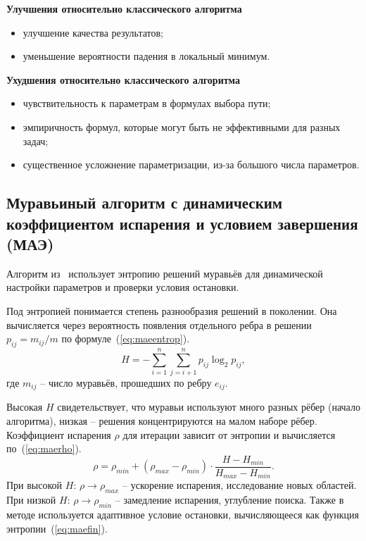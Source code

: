 \textbf{Улучшения относительно классического алгоритма}

\begin{itemize}
	\item улучшение качества результатов;
	\item уменьшение вероятности падения в локальный минимум.
\end{itemize}

\textbf{Ухудшения относительно классического алгоритма}

\begin{itemize}
	\item чувствительность к параметрам в формулах выбора пути;
	\item эмпиричность формул, которые могут быть не эффективными для разных задач;
	\item существенное усложнение параметризации, из-за большого числа параметров.
\end{itemize} 

\subsection*{Муравьиный алгоритм с динамическим коэффициентом испарения и условием завершения (МАЭ)}

Алгоритм из~\cite{admut} использует энтропию решений муравьёв для динамической настройки параметров и проверки условия остановки.

Под энтропией понимается степень разнообразия решений в поколении. Она вычисляется через вероятность появления отдельного ребра в решении $p_{ij}=m_{ij}/m$ по формуле~(\ref{eq:maeentrop}).
\begin{equation}
	H = -\sum_{i=1}^{n}\sum_{j=i+1}^{n} p_{ij} \log_2 p_{ij},
	\label{eq:maeentrop}
\end{equation}
где $m_{ij}$ -- число муравьёв, прошедших по ребру $e_{ij}$.

Высокая $H$ свидетельствует, что муравьи используют много разных рёбер (начало алгоритма), низкая -- решения концентрируются на малом наборе рёбер. Коэффициент испарения $\rho$ для итерации зависит от энтропии и вычисляется по~(\ref{eq:maerho}).
\begin{equation}
\rho = \rho_{min} + (\rho_{max} - \rho_{min}) \cdot \frac{H - H_{min}}{H_{max} - H_{min}}.
\label{eq:maerho}
\end{equation}
При высокой $H$: $\rho \to \rho_{max}$ -- ускорение испарения, исследование новых областей. При низкой $H$: $\rho \to \rho_{min}$ -- замедление испарения, углубление поиска. Также в методе используется адаптивное условие остановки, вычисляющееся как функция энтропии~(\ref{eq:maefin}).

